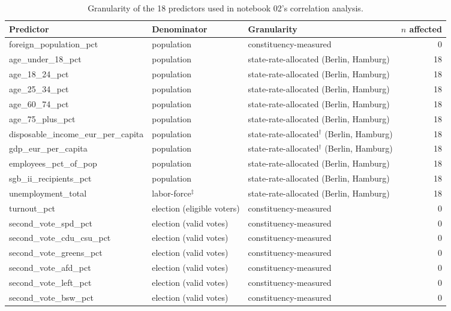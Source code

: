 
\begin{table}[htbp]
\centering
\footnotesize
\setlength{\tabcolsep}{4pt}
\caption{Granularity of the 18 predictors used in notebook 02's correlation analysis.}
\label{tab:predictor-granularity}
\begin{tabular}{@{} l l l r @{}}
\toprule
Predictor & Denominator & Granularity & $n$ affected \\
\midrule
foreign\_population\_pct & population & constituency-measured & 0 \\
age\_under\_18\_pct & population & state-rate-allocated (Berlin, Hamburg) & 18 \\
age\_18\_24\_pct & population & state-rate-allocated (Berlin, Hamburg) & 18 \\
age\_25\_34\_pct & population & state-rate-allocated (Berlin, Hamburg) & 18 \\
age\_60\_74\_pct & population & state-rate-allocated (Berlin, Hamburg) & 18 \\
age\_75\_plus\_pct & population & state-rate-allocated (Berlin, Hamburg) & 18 \\
disposable\_income\_eur\_per\_capita & population & state-rate-allocated$^{\dagger}$ (Berlin, Hamburg) & 18 \\
gdp\_eur\_per\_capita & population & state-rate-allocated$^{\dagger}$ (Berlin, Hamburg) & 18 \\
employees\_pct\_of\_pop & population & state-rate-allocated (Berlin, Hamburg) & 18 \\
sgb\_ii\_recipients\_pct & population & state-rate-allocated (Berlin, Hamburg) & 18 \\
unemployment\_total & labor-force$^{\ddagger}$ & state-rate-allocated (Berlin, Hamburg) & 18 \\
turnout\_pct & election (eligible voters) & constituency-measured & 0 \\
second\_vote\_spd\_pct & election (valid votes) & constituency-measured & 0 \\
second\_vote\_cdu\_csu\_pct & election (valid votes) & constituency-measured & 0 \\
second\_vote\_greens\_pct & election (valid votes) & constituency-measured & 0 \\
second\_vote\_afd\_pct & election (valid votes) & constituency-measured & 0 \\
second\_vote\_left\_pct & election (valid votes) & constituency-measured & 0 \\
second\_vote\_bsw\_pct & election (valid votes) & constituency-measured & 0 \\
\bottomrule
\end{tabular}


\end{table}
